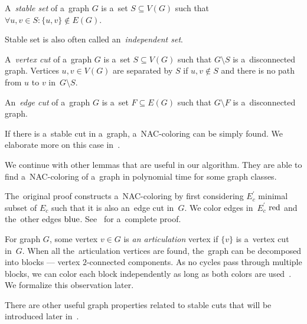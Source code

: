%
\begin{definition}
	A~\emph{stable set} of a~graph \( G \) is a~set \( S \subseteq V(G) \) such that
	\( \forall u, v \in S : \{u, v\} \not\in E(G) \).
\end{definition}
%
Stable set is also often called an~\emph{independent set}.
%
\begin{definition}
	A~\emph{vertex cut} of a~graph \( G \) is a~set \( S \subseteq V(G) \) such that
	\( G \setminus S \) is a~disconnected graph.
	Vertices \( u, v \in V(G) \) are separated by \( S \)
	if \( u, v \not\in S \)
	and there is no path from \( u \) to \( v \) in~\( G \setminus S \).
\end{definition}
%
\begin{definition}
	An~\emph{edge cut} of a~graph \( G \) is a~set \( F \subseteq E(G) \) such that
	\( G \setminus F \) is a~disconnected graph.
\end{definition}
%
%
If there is a~stable cut in a~graph, a~NAC-coloring can be simply found.
We elaborate more on this case in~.

We continue with other lemmas that are useful in our algorithm.
They are able to find a~NAC-coloring of a~graph in polynomial time for some graph classes.
%
%
The~original proof constructs a~NAC-coloring by first considering
\( E_c^\prime \) minimal subset of \( E_c \)
such that it is also an~edge cut in~\( G \).
We color edges in~\( E_c^\prime \) \( \text{red} \) and the~other edges \( \text{blue} \).
See~\cite{legersky_original} for a~complete proof.

For graph \( G \), some vertex \( v \in G \) is \emph{an articulation} vertex if
\( \{v\} \) is a~vertex cut in~\( G \).
When all the~articulation vertices are found,
the~graph can be decomposed into blocks
--- vertex \( 2 \)-connected components.
As no cycles pass through multiple blocks, we can color each block
independently as long as both colors are used~\cite{my_paper}.
We formalize this observation later.

There are other useful graph properties related to stable cuts
that will be introduced later in~.

